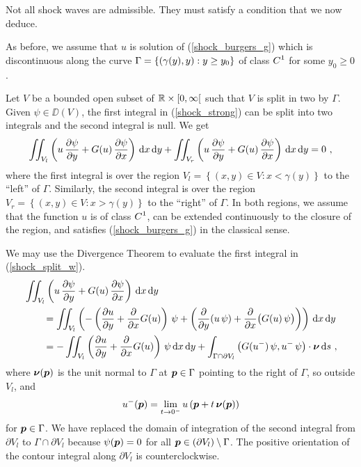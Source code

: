 Not all shock waves are admissible.  They must satisfy a condition that
we now deduce.

As before, we assume that $u$ is solution of (\ref{shock_burgers_g})
which is discontinuous along the curve
$\DS \Gamma = \left\{ (\gamma(y),y) : y \geq y_0 \right\}$ of
class $\DS C^1$ for some $y_0 \geq 0$.

Let $V$ be a bounded open subset of $\RR \times [0,\infty[$ such that
$V$ is split in two by $\Gamma$.  Given $\psi \in \DD(V)$, the first
integral in (\ref{shock_strong}) can be split into two integrals and
the second integral is null.  We get
\begin{equation} \label{shock_split_w}
\iint_{V_l}
\left(u\,\pdydx{\psi}{y} + G(u)\,\pdydx{\psi}{x} \right) \dx{x}\dx{y} \\
+ \iint_{V_r}
\left(u\,\pdydx{\psi}{y} + G(u)\,\pdydx{\psi}{x} \right) \dx{x}\dx{y} = 0 \ ,
\end{equation}
where the first integral is over the region
$V_l = \left\{ (x,y) \in V : x < \gamma(y)  \right\}$
to the ``left'' of $\Gamma$.  Similarly, the second integral
is over the region $V_r = \left\{ (x,y) \in V : x > \gamma(y) \right\}$
to the ``right'' of $\Gamma$.  In both regions, we
assume that the function $u$ is of class $\DS C^1$, can be
extended continuously to the closure of the region, and
satisfies (\ref{shock_burgers_g}) in the classical sense.

We may use the Divergence Theorem to evaluate the first integral in
(\ref{shock_split_w}).
\begin{align}
& \iint_{V_l}
\left(u\,\pdydx{\psi}{y} + G(u)\,\pdydx{\psi}{x} \right) \dx{x}\dx{y}
\nonumber \\
&\qquad = \iint_{V_l} \left(
-\left( \pdydx{u}{y}+ \pdfdx{G(u)}{x}\right)\,\psi
+ \left( \pdfdx{\left(u\,\psi\right)}{y} +
\pdfdx{\big(G(u)\,\psi\big)}{x} \right) \right) \dx{x}\dx{y}
\nonumber \\
&\qquad = -\iint_{V_l}
\left( \pdydx{u}{y} + \pdfdx{G(u)}{x} \right)\,\psi
\dx{x}\dx{y}
+ \int_{\Gamma \cap \partial V_l} \left(G(u^-)\,\psi, u^-\,\psi \right)\cdot
\VEC{\nu} \dx{s} \ , \label{shock_burgers_W1}
\end{align}
where $\DS \VEC{\nu}(\VEC{p})$ is the unit normal to $\Gamma$
at $\VEC{p} \in \Gamma$ pointing to the right of $\Gamma$, so outside
$V_l$, and
\[
u^-(\VEC{p}) = \lim_{t\rightarrow 0^-}
u\left(\VEC{p}+t\, \VEC{\nu}(\VEC{p})\right)
\]
for $\VEC{p} \in \Gamma$.
We have replaced the domain of integration of the second integral from
$\partial V_l$ to $\Gamma \cap \partial V_l$ because
$\psi(\VEC{p}) = 0$ for all $\VEC{p} \in (\partial V_l) \setminus \Gamma$.
The positive orientation of the contour integral along $\partial V_l$ is
counterclockwise.

